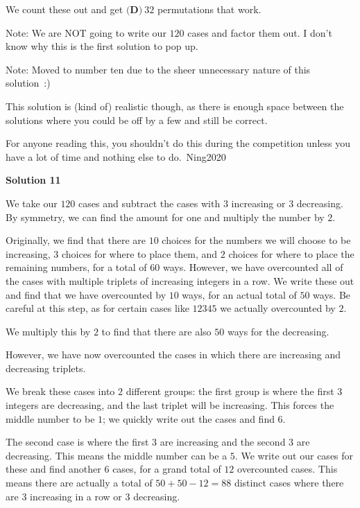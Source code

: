 \begin{enumerate}
 We count these out and get $\boxed{\textbf{(D)} ~32}$ permutations that work. 

 Note: We are NOT going to write our $120$ cases and factor them out. I don't know why this is the first solution to pop up.

 Note: Moved to number ten due to the sheer unnecessary nature of this solution :)

 This solution is (kind of) realistic though, as there is enough space between the solutions where you could be off by a few and still be correct.

 For anyone reading this, you shouldn't do this during the competition unless you have a lot of time and nothing else to do.~Ning2020

 



\textbf{Solution 11}

We take our $120$ cases and subtract the cases with $3$ increasing or $3$ decreasing. By symmetry, we can find the amount for one and multiply the number by $2$. 

 Originally, we find that there are $10$ choices for the numbers we will choose to be increasing, $3$ choices for where to place them, and $2$ choices for where to place the remaining numbers, for a total of $60$ ways. However, we have overcounted all of the cases with multiple triplets of increasing integers in a row. We write these out and find that we have overcounted by $10$ ways, for an actual total of $50$ ways. Be careful at this step, as for certain cases like $12345$ we actually overcounted by $2$.

 We multiply this by $2$ to find that there are also $50$ ways for the decreasing.

 However, we have now overcounted the cases in which there are increasing and decreasing triplets.

 We break these cases into $2$ different groups: the first group is where the first $3$ integers are decreasing, and the last triplet will be increasing. This forces the middle number to be $1$; we quickly write out the cases and find $6$.

 The second case is where the first $3$ are increasing and the second $3$ are decreasing. This means the middle number can be a $5$. We write out our cases for these and find another $6$ cases, for a grand total of $12$ overcounted cases. This means there are actually a total of $50+50-12=88$ distinct cases where there are $3$ increasing in a row or $3$ decreasing.


\end{enumerate}
